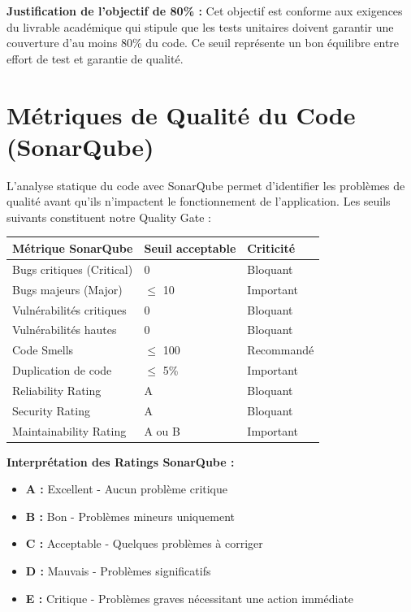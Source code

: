 \documentclass[12pt,a4paper]{report}
\begin{document}
\textbf{Justification de l'objectif de 80\% :} Cet objectif est conforme aux exigences du livrable académique qui stipule que les tests unitaires doivent garantir une couverture d'au moins 80\% du code. Ce seuil représente un bon équilibre entre effort de test et garantie de qualité.

\section{Métriques de Qualité du Code (SonarQube)}

L'analyse statique du code avec SonarQube permet d'identifier les problèmes de qualité avant qu'ils n'impactent le fonctionnement de l'application. Les seuils suivants constituent notre Quality Gate :

\begin{center}
\begin{tabular}{|l|l|l|}
    \hline
    \textbf{Métrique SonarQube} & \textbf{Seuil acceptable} & \textbf{Criticité} \\
    \hline
    Bugs critiques (Critical) & 0 & Bloquant \\
    \hline
    Bugs majeurs (Major) & $\leq$ 10 & Important \\
    \hline
    Vulnérabilités critiques & 0 & Bloquant \\
    \hline
    Vulnérabilités hautes & 0 & Bloquant \\
    \hline
    Code Smells & $\leq$ 100 & Recommandé \\
    \hline
    Duplication de code & $\leq$ 5\% & Important \\
    \hline
    Reliability Rating & A & Bloquant \\
    \hline
    Security Rating & A & Bloquant \\
    \hline
    Maintainability Rating & A ou B & Important \\
    \hline
\end{tabular}
\end{center}

\textbf{Interprétation des Ratings SonarQube :}
\begin{itemize}
    \item \textbf{A :} Excellent - Aucun problème critique
    \item \textbf{B :} Bon - Problèmes mineurs uniquement
    \item \textbf{C :} Acceptable - Quelques problèmes à corriger
    \item \textbf{D :} Mauvais - Problèmes significatifs
    \item \textbf{E :} Critique - Problèmes graves nécessitant une action immédiate
\end{itemize}
\end{document}
